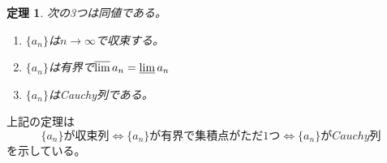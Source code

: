 \documentclass[dvipdfmx,a4j,10pt]{jsarticle}
\theoremstyle{mystyle1}
\newtheorem{thm}[dfn]{定理}
\theoremstyle{mystyle2}
\begin{document}
\begin{framed}
    \begin{thm}\label{thm3.8}次の3つは同値である。
        \begin{enumerate}
        	\item $\{a_n\}$は$n\to\infty$で収束する。
        	\item $\{a_n\}$は有界で$\varlimsup a_n=\varliminf a_n$
        	\item $\{a_n\}$はCauchy列である。
        \end{enumerate}
    \end{thm}
\end{framed}

上記の定理は
\[\{a_n\}が収束列\Leftrightarrow \{a_n\}が有界で集積点がただ1つ\Leftrightarrow \{a_n\}がCauchy列\]
を示している。
\end{document}
